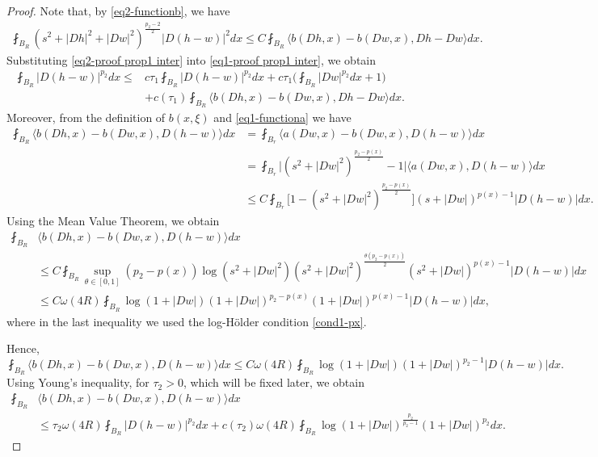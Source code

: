 \documentclass[a4paper,10pt]{amsart}
\newcommand{\px}{p(x)}
\newcommand{\f}{\frac}
\newcommand{\om}{\omega}
\begin{document}
\begin{proof}
	Note that, by \eqref{eq2-functionb}, we have
	\begin{equation}\label{eq2-proof prop1 inter}
	\begin{aligned}
	\fint_{B_{R}}(s^2+|Dh|^2+|Dw|^2)^{\f{p_2-2}{2}}|D(h-w)|^2dx \leq C\fint_{B_{R}} \langle b(Dh,x)-b(Dw,x), Dh-Dw \rangle dx.
	\end{aligned}
	\end{equation}
	Substituting \eqref{eq2-proof prop1 inter} into \eqref{eq1-proof prop1 inter}, we obtain
	\begin{equation}\label{eq2s-proof prop1 inter}
	\begin{aligned}
	\fint_{B_R}|D(h-w)|^{p_2} dx\leq&  c\tau_1\fint_{B_R}|D(h-w)|^{p_2} dx +c\tau_1\Big(\fint_{B_{R}}|Dw|^{p_2}dx+1\Big)\\
	& + c(\tau_1)\fint_{B_{R}} \langle b(Dh,x)-b(Dw,x), Dh-Dw \rangle dx.
	\end{aligned}
	\end{equation}
	Moreover, from the definition of $b(x,\xi)$ and \eqref{eq1-functiona} we have
	$$
	\begin{aligned}
	\fint_{B_{R}} \langle b(Dh,x)-b(Dw,x), D(h-w) \rangle dx
	&=\fint_{B_{r}} \langle a(Dw,x)-b(Dw,x), D(h-w) \rangle dx\\
	&=\fint_{B_{r}} \Big|(s^2+|Dw|^2)^{\f{p_2-\px}{2}}-1\Big|\langle a(Dw,x), D(h-w) \rangle dx\\
	&\leq C\fint_{B_{r}} \Big[1-(s^2+|Dw|^2)^{\f{p_2-\px}{2}}\Big] (s+|Dw|)^{\px -1} |D(h-w)| dx.
	\end{aligned}
	$$
	Using the Mean Value Theorem, we obtain
	$$
	\begin{aligned}
	\fint_{B_{R}} &\langle b(Dh,x)-b(Dw,x), D(h-w) \rangle dx\\
	&\leq C\fint_{B_{R}}\sup_{\theta\in [0,1]} (p_2-p(x))\log(s^2+|Dw|^2)(s^2+|Dw|^2)^{\f{\theta(p_2-\px)}{2}}(s^2+|Dw|)^{\px -1} |D(h-w)| dx\\
	&\leq C\om(4R)\fint_{B_{R}} \log(1+|Dw|)(1+|Dw|)^{p_2-\px}(1+|Dw|)^{\px -1} |D(h-w)| dx,
	\end{aligned}
	$$
	where in the last inequality we used the log-H\"older condition \eqref{cond1-px}.
	
	Hence,
	$$\fint_{B_{R}} \langle b(Dh,x)-b(Dw,x), D(h-w) \rangle dx\leq C\omega(4R)\fint_{B_{R}} \log(1+|Dw|)(1+|Dw|)^{p_2-1} |D(h-w)| dx.
	$$
    Using Young's inequality, for $\tau_2>0$, which will be fixed later, we obtain
	\begin{equation}
	\label{eq2-prop2-inter}
	\begin{aligned}
	\fint_{B_{R}} &\langle b(Dh,x)-b(Dw,x), D(h-w) \rangle dx\\
	&\leq \tau_2 \omega(4R)\fint_{B_{R}}|D(h-w)|^{p_2} dx + c(\tau_2)\omega(4R)\fint_{B_{R}} \log(1+|Dw|)^{\f{p_2}{p_2-1}}(1+|Dw|)^{p_2}dx.
	\end{aligned}
	\end{equation}
	

\end{proof}
\end{document}
